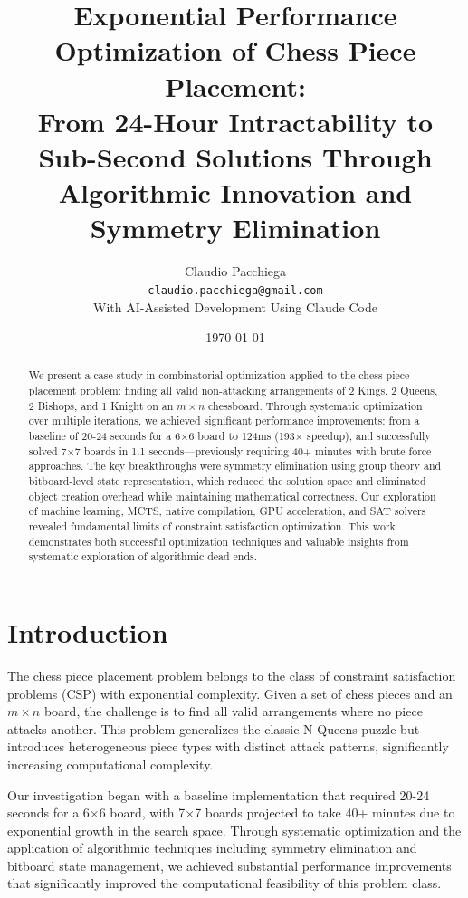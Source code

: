 \documentclass[12pt,a4paper]{article}
\title{Exponential Performance Optimization of Chess Piece Placement:\\
From 24-Hour Intractability to Sub-Second Solutions Through\\
Algorithmic Innovation and Symmetry Elimination}
\author{Claudio Pacchiega\\
\texttt{claudio.pacchiega@gmail.com}\\
\small{With AI-Assisted Development Using Claude Code}}
\date{\today}
\theoremstyle{definition}
\begin{document}
\maketitle

\begin{abstract}
We present a case study in combinatorial optimization applied to the chess piece placement problem: finding all valid non-attacking arrangements of 2 Kings, 2 Queens, 2 Bishops, and 1 Knight on an $m \times n$ chessboard. Through systematic optimization over multiple iterations, we achieved significant performance improvements: from a baseline of 20-24 seconds for a 6$\times$6 board to 124ms (193$\times$ speedup), and successfully solved 7$\times$7 boards in 1.1 seconds—previously requiring 40+ minutes with brute force approaches. The key breakthroughs were symmetry elimination using group theory and bitboard-level state representation, which reduced the solution space and eliminated object creation overhead while maintaining mathematical correctness. Our exploration of machine learning, MCTS, native compilation, GPU acceleration, and SAT solvers revealed fundamental limits of constraint satisfaction optimization. This work demonstrates both successful optimization techniques and valuable insights from systematic exploration of algorithmic dead ends.
\end{abstract}

\section{Introduction}

The chess piece placement problem belongs to the class of constraint satisfaction problems (CSP) with exponential complexity. Given a set of chess pieces and an $m \times n$ board, the challenge is to find all valid arrangements where no piece attacks another. This problem generalizes the classic N-Queens puzzle but introduces heterogeneous piece types with distinct attack patterns, significantly increasing computational complexity.

Our investigation began with a baseline implementation that required 20-24 seconds for a 6$\times$6 board, with 7$\times$7 boards projected to take 40+ minutes due to exponential growth in the search space. Through systematic optimization and the application of algorithmic techniques including symmetry elimination and bitboard state management, we achieved substantial performance improvements that significantly improved the computational feasibility of this problem class.
\end{document}
